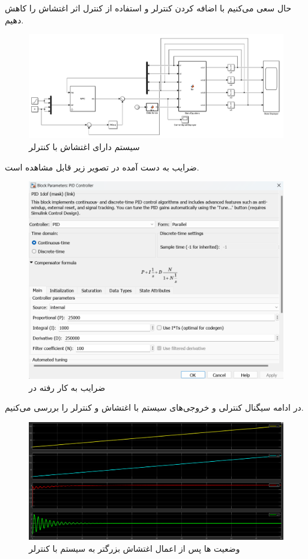 \documentclass[14pt, a4paper]{extarticle}
\begin{document}
\newpage

حال سعی می‌کنیم با اضافه کردن کنترلر 
و استفاده از کنترل 
اثر اغتشاش را کاهش دهیم.
\begin{figure}[h!]
	\centering
	\includegraphics[scale = 0.5]{Q2_3_1_sim.png}
	\caption{سیستم دارای اغتشاش با کنترلر 
		}
\end{figure}

ضرایب 
به دست آمده در تصویر زیر قابل مشاهده است.
\begin{figure}[h!]
	\centering
	\includegraphics[scale = 0.5]{Q2_3_2_pid.png}
	\caption{ضرایب 
		به کار رفته در 
		}
\end{figure}

\newpage
در ادامه سیگنال کنترلی و خروجی‌های سیستم با اغتشاش و کنترلر 
 را بررسی می‌کنیم.
\begin{figure}[h!]
	\centering
	\includegraphics[scale = 0.4]{Q2_3_2_states1D.png}
	\caption{وضعیت 
		ها پس از اعمال اغتشاش بزرگتر به سیستم با کنترلر 
		}
\end{figure}
\end{document}
